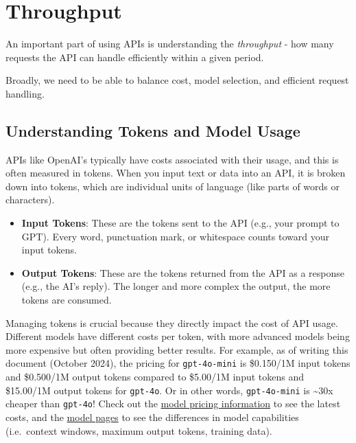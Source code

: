 \documentclass[
  letterpaper,
  DIV=11,
  numbers=noendperiod]{scrreprt}
\begin{document}
\section{Throughput}\label{throughput}

An important part of using APIs is understanding the \emph{throughput} -
how many requests the API can handle efficiently within a given period.

Broadly, we need to be able to balance cost, model selection, and
efficient request handling.

\subsection{Understanding Tokens and Model
Usage}\label{understanding-tokens-and-model-usage}

APIs like OpenAI's typically have costs associated with their usage, and
this is often measured in tokens. When you input text or data into an
API, it is broken down into tokens, which are individual units of
language (like parts of words or characters).

\begin{itemize}
\item
  \textbf{Input Tokens}: These are the tokens sent to the API (e.g.,
  your prompt to GPT). Every word, punctuation mark, or whitespace
  counts toward your input tokens.
\item
  \textbf{Output Tokens}: These are the tokens returned from the API as
  a response (e.g., the AI's reply). The longer and more complex the
  output, the more tokens are consumed.
\end{itemize}

Managing tokens is crucial because they directly impact the cost of API
usage. Different models have different costs per token, with more
advanced models being more expensive but often providing better results.
For example, as of writing this document (October 2024), the pricing for
\texttt{gpt-4o-mini} is \$0.150/1M input tokens and \$0.500/1M output
tokens compared to \$5.00/1M input tokens and \$15.00/1M output tokens
for \texttt{gpt-4o}. Or in other words, \texttt{gpt-4o-mini} is
\textasciitilde30x cheaper than \texttt{gpt-4o}! Check out the
\href{https://openai.com/api/pricing/}{model pricing information} to see
the latest costs, and the
\href{https://platform.openai.com/docs/models/gpt-4o}{model pages} to
see the differences in model capabilities (i.e.~context windows, maximum
output tokens, training data).
\end{document}
